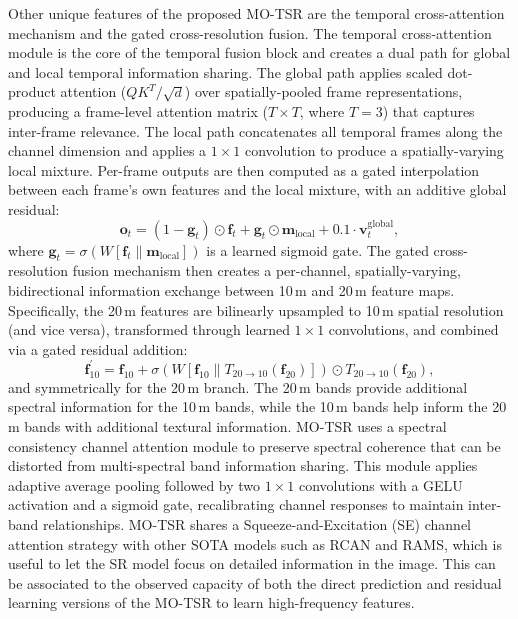         Other unique features of the proposed MO-TSR are the temporal cross-attention mechanism and the gated cross-resolution fusion. The temporal cross-attention module is the core of the temporal fusion block and creates a dual path for global and local temporal information sharing. The global path applies scaled dot-product attention ($QK^T/\sqrt{d}$) over spatially-pooled frame representations, producing a frame-level attention matrix ($T \times T$, where $T = 3$) that captures inter-frame relevance. The local path concatenates all temporal frames along the channel dimension and applies a $1 \times 1$ convolution to produce a spatially-varying local mixture. Per-frame outputs are then computed as a gated interpolation between each frame's own features and the local mixture, with an additive global residual:
        \begin{equation}
            \mathbf{o}_t = (1 - \mathbf{g}_t) \odot \mathbf{f}_t + \mathbf{g}_t \odot \mathbf{m}_{\text{local}} + 0.1 \cdot \mathbf{v}_t^{\text{global}},
        \end{equation}
        where $\mathbf{g}_t = \sigma(W[\mathbf{f}_t \| \mathbf{m}_{\text{local}}])$ is a learned sigmoid gate. The gated cross-resolution fusion mechanism then creates a per-channel, spatially-varying, bidirectional information exchange between 10\,m and 20\,m feature maps. Specifically, the 20\,m features are bilinearly upsampled to 10\,m spatial resolution (and vice versa), transformed through learned $1 \times 1$ convolutions, and combined via a gated residual addition:
        \begin{equation}
            \mathbf{f}_{10}^{\prime} = \mathbf{f}_{10} + \sigma\!\left(W\!\left[\mathbf{f}_{10} \| T_{20 \to 10}(\mathbf{f}_{20})\right]\right) \odot T_{20 \to 10}(\mathbf{f}_{20}),
        \end{equation}
        and symmetrically for the 20\,m branch. The 20\,m bands provide additional spectral information for the 10\,m bands, while the 10\,m bands help inform the 20\,m bands with additional textural information. MO-TSR uses a spectral consistency channel attention module to preserve spectral coherence that can be distorted from multi-spectral band information sharing. This module applies adaptive average pooling followed by two $1 \times 1$ convolutions with a GELU activation and a sigmoid gate, recalibrating channel responses to maintain inter-band relationships. MO-TSR shares a Squeeze-and-Excitation (SE) channel attention strategy with other SOTA models such as RCAN and RAMS, which is useful to let the SR model focus on detailed information in the image. This can be associated to the observed capacity of both the direct prediction and residual learning versions of the MO-TSR to learn high-frequency features.

